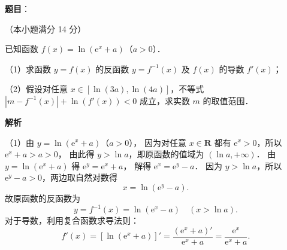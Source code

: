 \begin{answer}

\textbf{题目}：

（本小题满分 14 分）

已知函数 $f(x) = \ln(\mathrm{e}^x + a)$（$a > 0$）．

（1）求函数 $y = f(x)$ 的反函数 $y = f^{-1}(x)$ 及 $f(x)$ 的导数 $f'(x)$；

（2）假设对任意 $x \in [\ln(3a), \ln(4a)]$，不等式 $|m - f^{-1}(x)| + \ln(f'(x)) < 0$ 成立，求实数 $m$ 的取值范围．

\textbf{解析}

（1）由 $y = \ln(\mathrm{e}^x + a)$（$a > 0$），
因为对任意 $x \in \mathbf{R}$ 都有 $\mathrm{e}^x > 0$，所以 $\mathrm{e}^x + a > a > 0$，
由此得 $y > \ln a$，即原函数的值域为 $(\ln a, +\infty)$．
由 $y = \ln(\mathrm{e}^x + a)$ 得 $\mathrm{e}^y = \mathrm{e}^x + a$，
解得 $\mathrm{e}^x = \mathrm{e}^y - a$．
因为 $y > \ln a$，所以 $\mathrm{e}^y - a > 0$，两边取自然对数得
\nopagebreak[4]
\[
x = \ln(\mathrm{e}^y - a).
\]
故原函数的反函数为
\nopagebreak[4]
\[
y = f^{-1}(x) = \ln(\mathrm{e}^x - a) \quad (x > \ln a).
\]
对于导数，利用复合函数求导法则：
\nopagebreak[4]
\[
f'(x) = [\ln(\mathrm{e}^x + a)]' = \frac{(\mathrm{e}^x + a)'}{\mathrm{e}^x + a} = \frac{\mathrm{e}^x}{\mathrm{e}^x + a}.
\]


\end{answer}
